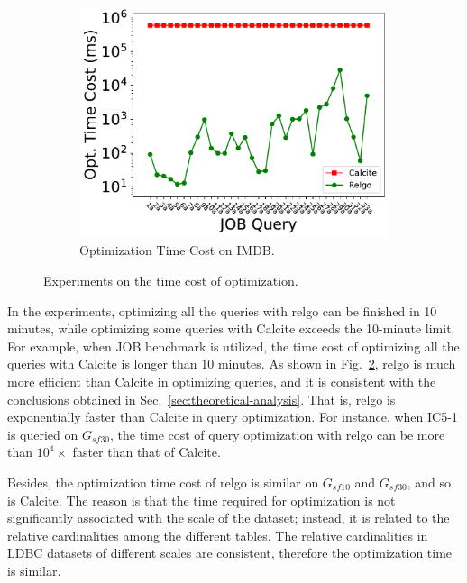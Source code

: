 \begin{figure}[ht]
\begin{subfigure}[b]{0.3\linewidth}
        \centering
        \includegraphics[width=\linewidth]{./figures/exp/optimization_job.pdf}
        \caption{Optimization Time Cost on IMDB.}
        \label{fig:exp-optimization-job}
    \end{subfigure}
    \caption{Experiments on the time cost of optimization.}
    \label{fig:exp-optimization}
\end{figure}

In the experiments, optimizing all the queries with relgo can be finished in 10 minutes, while optimizing some queries with Calcite exceeds the 10-minute limit.
For example, when JOB benchmark is utilized, the time cost of optimizing all the queries with Calcite is longer than 10 minutes.
As shown in Fig.~\ref{fig:exp-optimization}, relgo is much more efficient than Calcite in optimizing queries, and it is consistent with the conclusions obtained in Sec.~\ref{sec:theoretical-analysis}.
That is, relgo is exponentially faster than Calcite in query optimization.
For instance, when IC5-1 is queried on $G_{sf30}$, the time cost of query optimization with relgo can be more than $10^4\times$ faster than that of Calcite.

Besides, the optimization time cost of relgo is similar on $G_{sf10}$ and $G_{sf30}$, and so is Calcite.
The reason is that the time required for optimization is not significantly associated with the scale of the dataset; instead, it is related to the relative cardinalities among the different tables.
The relative cardinalities in LDBC datasets of different scales are consistent, therefore the optimization time is similar.


